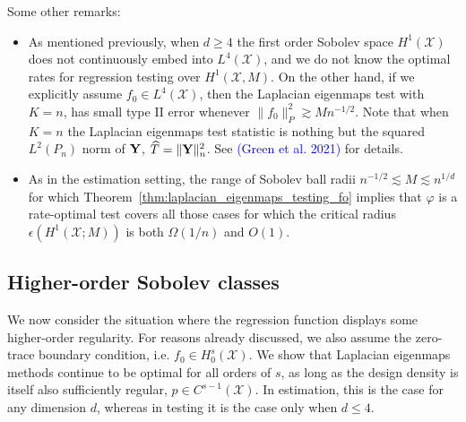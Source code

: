 \documentclass{article}
\newcommand{\1}{\mathbf{1}}
\newcommand{\Leb}{L}
\newcommand{\mc}[1]{\mathcal{#1}}
\newcommand{\wh}[1]{\widehat{#1}}
\theoremstyle{alden}
\theoremstyle{aldenthm}
\theoremstyle{definition}
\theoremstyle{remark}
\begin{document}
Some other remarks:
\begin{itemize}
	\item As mentioned previously, when $d \geq 4$ the first order Sobolev space $H^1(\mc{X})$ does not continuously embed into $\Leb^4(\mc{X})$, and we do not know the optimal rates for regression testing over $H^1(\mc{X},M)$. On the other hand, if we explicitly assume $f_0 \in \Leb^4(\mc{X})$, then the Laplacian eigenmaps test with $K = n$, has small type II error whenever $\|f_0\|_P^2 \gtrsim Mn^{-1/2}$. Note that when $K = n$ the Laplacian eigenmaps test statistic is nothing but the squared $L^2(P_n)$ norm of ${\bf Y}$, $\wh{T} = \|{\bf Y}\|_n^2$. See \textcolor{blue}{(Green et al. 2021)} for details.
	\item As in the estimation setting, the range of Sobolev ball radii $n^{-1/2} \lesssim M \lesssim n^{1/d}$ for which Theorem~\ref{thm:laplacian_eigenmaps_testing_fo} implies that $\varphi$ is a rate-optimal test covers all those cases for which the critical radius $\epsilon(H^1(\mc{X};M))$ is both $\Omega(1/n)$ and $O(1)$.
\end{itemize}

\subsection{Higher-order Sobolev classes}
\label{sec:higher_order_sobolev_classes}
We now consider the situation where the regression function displays some higher-order regularity. For reasons already discussed, we also assume the zero-trace boundary condition, i.e. $f_0 \in H_0^s(\mc{X})$. We show that Laplacian eigenmaps methods continue to be optimal for all orders of $s$, as long as the design density is itself also sufficiently regular, $p \in C^{s - 1}(\mc{X})$. In estimation, this is the case for any dimension $d$, whereas in testing it is the case only when $d \leq 4$. 
\end{document}
